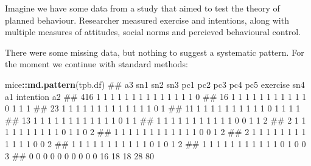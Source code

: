 \documentclass[]{article}
\newenvironment{Shaded}{\begin{snugshade}}{\end{snugshade}}
\newcommand{\KeywordTok}[1]{\textcolor[rgb]{0.13,0.29,0.53}{\textbf{#1}}}
\newcommand{\DataTypeTok}[1]{\textcolor[rgb]{0.13,0.29,0.53}{#1}}
\newcommand{\StringTok}[1]{\textcolor[rgb]{0.31,0.60,0.02}{#1}}
\newcommand{\OperatorTok}[1]{\textcolor[rgb]{0.81,0.36,0.00}{\textbf{#1}}}
\newcommand{\NormalTok}[1]{#1}
\theoremstyle{definition}
\theoremstyle{definition}
\theoremstyle{definition}
\theoremstyle{remark}
\begin{document}
Imagine we have some data from a study that aimed to test the theory of
planned behaviour. Researcher measured exercise and intentions, along
with multiple measures of attitudes, social norms and percieved
behavioural control.

\begin{Shaded}
\end{Shaded}

There were some missing data, but nothing to suggest a systematic
pattern. For the moment we continue with standard methods:

\begin{Shaded}
\begin{Highlighting}[]
\NormalTok{mice}\OperatorTok{::}\KeywordTok{md.pattern}\NormalTok{(tpb.df) }
\NormalTok{##     a3 sn1 sn2 sn3 pc1 pc2 pc3 pc4 pc5 exercise sn4 a1 intention a2   }
\NormalTok{## 416  1   1   1   1   1   1   1   1   1        1   1  1         1  1  0}
\NormalTok{##  16  1   1   1   1   1   1   1   1   1        1   1  0         1  1  1}
\NormalTok{##  23  1   1   1   1   1   1   1   1   1        1   1  1         1  0  1}
\NormalTok{##  11  1   1   1   1   1   1   1   1   1        1   0  1         1  1  1}
\NormalTok{##  13  1   1   1   1   1   1   1   1   1        1   1  1         0  1  1}
\NormalTok{##   1  1   1   1   1   1   1   1   1   1        1   0  0         1  1  2}
\NormalTok{##   2  1   1   1   1   1   1   1   1   1        1   0  1         1  0  2}
\NormalTok{##   1  1   1   1   1   1   1   1   1   1        1   1  0         0  1  2}
\NormalTok{##   2  1   1   1   1   1   1   1   1   1        1   1  1         0  0  2}
\NormalTok{##   1  1   1   1   1   1   1   1   1   1        1   0  1         0  1  2}
\NormalTok{##   1  1   1   1   1   1   1   1   1   1        1   0  1         0  0  3}
\NormalTok{##      0   0   0   0   0   0   0   0   0        0  16 18        18 28 80}
\end{Highlighting}
\end{Shaded}
\end{document}
